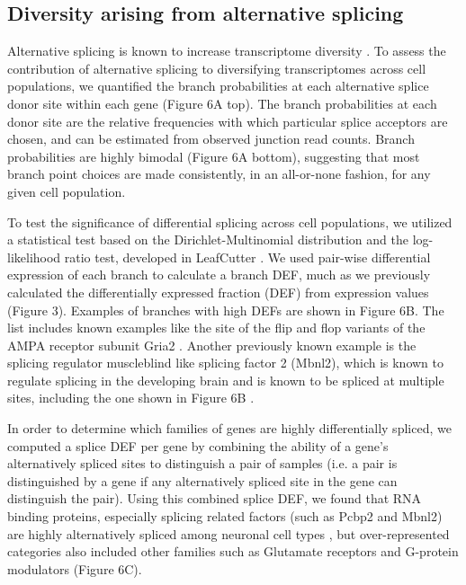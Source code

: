 \subsection{Diversity arising from alternative splicing}

Alternative splicing is known to increase transcriptome diversity \citep{ Andreadis_1987}. To assess the contribution of alternative splicing to diversifying transcriptomes across cell populations, we quantified the branch probabilities at each alternative splice donor site within each gene (Figure 6A top). The branch probabilities at each donor site are the relative frequencies with which particular splice acceptors are chosen, and can be estimated from observed junction read counts. Branch probabilities are highly bimodal (Figure 6A bottom), suggesting that most branch point choices are made consistently, in an all-or-none fashion, for any given cell population.

To test the significance of differential splicing across cell populations, we utilized a statistical test based on the Dirichlet-Multinomial distribution and the log-likelihood ratio test, developed in LeafCutter \citep{Li_2016}. We used pair-wise differential expression of each branch to calculate a branch DEF, much as we previously calculated the differentially expressed fraction (DEF) from expression values (Figure 3). Examples of branches with high DEFs are shown in Figure 6B. The list includes known examples like the site of the flip and flop variants of the AMPA receptor subunit Gria2 \citep{Sommer_1990}. Another previously known example is the splicing regulator muscleblind like splicing factor 2 (Mbnl2), which is known to regulate splicing in the developing brain  \citep{Charizanis_2012} and is known to be spliced at multiple sites, including the one shown in Figure 6B \citep{Pascual_2006}. 

In order to determine which families of genes are highly differentially spliced, we computed a splice DEF per gene by combining the ability of a gene’s alternatively spliced sites to distinguish a pair of samples (i.e. a pair is distinguished by a gene if any alternatively spliced site in the gene can distinguish the pair). Using this combined splice DEF, we found that RNA binding proteins, especially splicing related factors (such as Pcbp2 and Mbnl2) are highly alternatively spliced among neuronal cell types \citep{Zheng_2013}, but over-represented categories also included other families such as Glutamate receptors and G-protein modulators (Figure 6C). 

